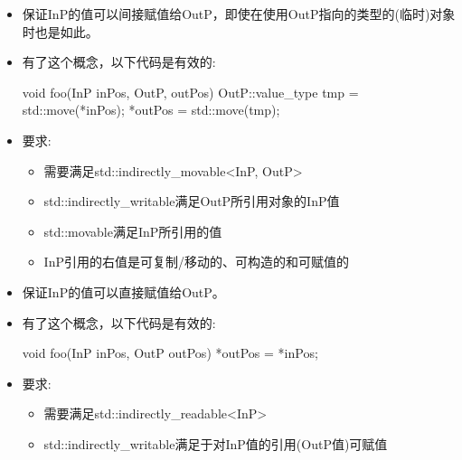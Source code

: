 
\begin{itemize}
\item
保证InP的值可以间接赋值给OutP，即使在使用OutP指向的类型的(临时)对象时也是如此。

\item
有了这个概念，以下代码是有效的:

\begin{cpp}
void foo(InP inPos, OutP, outPos) {
	OutP::value_type tmp = std::move(*inPos);
	*outPos = std::move(tmp);
}
\end{cpp}

\item
要求:
\begin{itemize}
\item
需要满足std::indirectly\_movable<InP, OutP>

\item
std::indirectly\_writable满足OutP所引用对象的InP值

\item
std::movable满足InP所引用的值

\item
InP引用的右值是可复制/移动的、可构造的和可赋值的
\end{itemize}
\end{itemize}


\begin{itemize}
\item
保证InP的值可以直接赋值给OutP。

\item
有了这个概念，以下代码是有效的:

\begin{cpp}
void foo(InP inPos, OutP outPos) {
	*outPos = *inPos;
}
\end{cpp}

\item
要求:
\begin{itemize}
\item
需要满足std::indirectly\_readable<InP>

\item
std::indirectly\_writable满足于对InP值的引用(OutP值)可赋值
\end{itemize}
\end{itemize}


